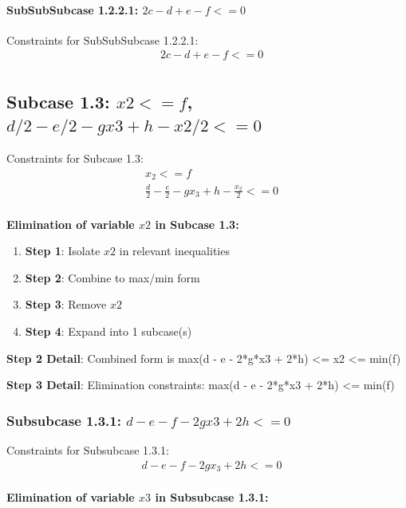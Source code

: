 \documentclass{article}
\begin{document}
\paragraph{SubSubSubcase 1.2.2.1: $2 c - d + e - f <= 0$}

Constraints for SubSubSubcase 1.2.2.1:
\begin{align}
& 2 c - d + e - f <= 0 \\
\end{align}

\subsection{Subcase 1.3: $x2 <= f$, $d/2 - e/2 - g x3 + h - x2/2 <= 0$}

Constraints for Subcase 1.3:
\begin{align}
& x_{2} <= f \\
& \frac{d}{2} - \frac{e}{2} - g x_{3} + h - \frac{x_{2}}{2} <= 0 \\
\end{align}

\textbf{Elimination of variable $x2$ in Subcase 1.3:}

\begin{enumerate}
\item \textbf{Step 1}: Isolate $x2$ in relevant inequalities
\item \textbf{Step 2}: Combine to max/min form
\item \textbf{Step 3}: Remove $x2$
\item \textbf{Step 4}: Expand into 1 subcase(s)
\end{enumerate}

\textbf{Step 2 Detail}: Combined form is max(d - e - 2*g*x3 + 2*h) <= x2 <= min(f)

\textbf{Step 3 Detail}: Elimination constraints:
\quad max(d - e - 2*g*x3 + 2*h) <= min(f)

\subsubsection{Subsubcase 1.3.1: $d - e - f - 2 g x3 + 2 h <= 0$}

Constraints for Subsubcase 1.3.1:
\begin{align}
& d - e - f - 2 g x_{3} + 2 h <= 0 \\
\end{align}

\textbf{Elimination of variable $x3$ in Subsubcase 1.3.1:}
\end{document}
